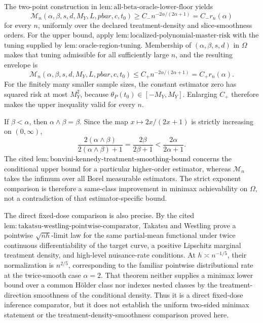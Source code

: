 The two-point construction in \(\mathrm{lem:all\text{-}beta\text{-}oracle\text{-}lower\text{-}floor}\) yields
\[
\mathcal M_n(\alpha,\beta,s,d,M_Y,L,pbar,c,t_0)
\ge C_-n^{-2\alpha/(2\alpha+1)}=C_-r_n(\alpha)
\]
for every \(n\), uniformly over the declared treatment-density and slice-smoothness orders. For the upper bound, apply \(\mathrm{lem:localized\text{-}polynomial\text{-}master\text{-}risk}\) with the tuning supplied by \(\mathrm{lem:oracle\text{-}region\text{-}tuning}\). Membership of \((\alpha,\beta,s,d)\) in \(\Omega\) makes that tuning admissible for all sufficiently large \(n\), and the resulting envelope is
\[
\mathcal M_n(\alpha,\beta,s,d,M_Y,L,pbar,c,t_0)
\le C_+n^{-2\alpha/(2\alpha+1)}=C_+r_n(\alpha).
\]
For the finitely many smaller sample sizes, the constant estimator zero has squared risk at most \(M_Y^2\), because \(\theta_P(t_0)\in[-M_Y,M_Y]\). Enlarging \(C_+\) therefore makes the upper inequality valid for every \(n\).

If \(\beta<\alpha\), then \(\alpha\wedge\beta=\beta\). Since the map \(x\mapsto2x/(2x+1)\) is strictly increasing on \((0,\infty)\),
\[
\frac{2(\alpha\wedge\beta)}{2(\alpha\wedge\beta)+1}
=
\frac{2\beta}{2\beta+1}
<
\frac{2\alpha}{2\alpha+1}.
\]
The cited \(\mathrm{lem:bonvini\text{-}kennedy\text{-}treatment\text{-}smoothing\text{-}bound}\) concerns the conditional upper bound for a particular higher-order estimator, whereas \(\mathcal M_n\) takes the infimum over all Borel measurable estimators. The strict exponent comparison is therefore a same-class improvement in minimax achievability on \(\Omega\), not a contradiction of that estimator-specific bound.

The direct fixed-dose comparison is also precise. By the cited \(\mathrm{lem:takatsu\text{-}westling\text{-}pointwise\text{-}comparator}\), Takatsu and Westling prove a pointwise \(\sqrt{nh}\)-limit law for the same partial-mean functional under twice continuous differentiability of the target curve, a positive Lipschitz marginal treatment density, and high-level nuisance-rate conditions. At \(h\asymp n^{-1/5}\), their normalization is \(n^{2/5}\), corresponding to the familiar pointwise distributional rate at the twice-smooth case \(\alpha=2\). That theorem neither supplies a minimax lower bound over a common Hölder class nor indexes nested classes by the treatment-direction smoothness of the conditional density. Thus it is a direct fixed-dose inference comparator, but it does not establish the uniform two-sided minimax statement or the treatment-density-smoothness comparison proved here.
